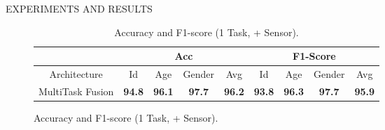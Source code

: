 \documentclass[10pt]{beamer}
\begin{document}
\begin{frame}{EXPERIMENTS AND RESULTS}
\begin{minipage}{\linewidth}
\begin{minipage}{0.45\linewidth}
\begin{figure}[htbp]
                \centering
                \begin{table}[h!]
                    \centering
                    \begin{adjustbox}{max width=\textwidth}
                    \begin{tabular}{|c||ccc|c||ccc|c|}
                        \hline
                            & \multicolumn{4}{c||}{Acc} & \multicolumn{4}{c|}{F1-Score} \\
                        \hline
                            Architecture & Id & Age & Gender & Avg & Id & Age & Gender & Avg\\
                        \hline
                            MultiTask Fusion & \bfseries{94.8} & \bfseries{96.1} & \bfseries{97.7} & \bfseries{96.2} & \bfseries{93.8} & \bfseries{96.3} & \bfseries{97.7} & \bfseries{95.9}\\
                        \hline 
                    \end{tabular}
                    \end{adjustbox}
                    \caption{Accuracy and F1-score (1 Task, + Sensor).}
                    \label{table accuracy and F1 (+ Task, + Sensor)}
                \end{table}
            \end{figure}
        \end{minipage}
    \end{minipage}
\end{frame}
\end{document}
